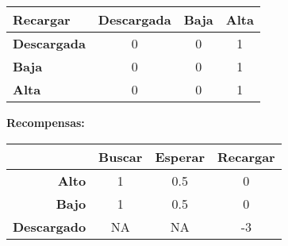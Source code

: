 \begin{enumerate}[label=\alph*.]
\begin{table}[H]
\begin{tabular}{|l|c|c|c|}
    \hline
    \textbf{Recargar}     & \textbf{Descargada} & \textbf{Baja} & \textbf{Alta} \\ \hline   
    \textbf{Descargada} & 0   & 0   & 1       \\ \hline   
    \textbf{Baja} & 0   & 0    & 1       \\ \hline              
    \textbf{Alta} & 0     & 0     & 1          \\ \hline  
    \end{tabular}
    \end{table}
    \textbf{Recompensas:}\\
    \begin{table}[H]
    \centering
    \begin{tabular}{| r | c|c|c |}
    \hline
     & \textbf{Buscar} & \textbf{Esperar} & \textbf{Recargar}\\
    \hline
    \textbf{Alto} & 1 & 0.5 & 0 \\
    \hline
    \textbf{Bajo} & 1 & 0.5 & 0 \\
    \hline
    \textbf{Descargado} & NA & NA & -3 \\
    \hline
    \end{tabular}
    \end{table}
    \end{enumerate}
